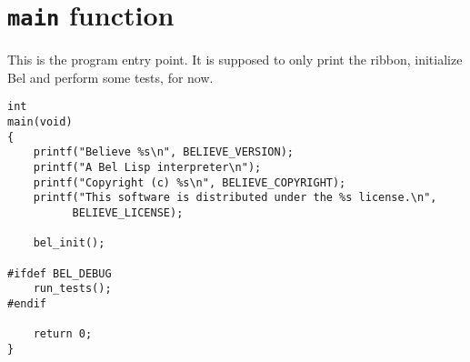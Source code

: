 \documentclass[openright,a4paper,twoside,12pt]{memoir}
\begin{document}
\section{\texttt{main} function}
\label{sec:orge465752}

This is the program entry point. It is supposed to only print the
ribbon, initialize Bel and perform some tests, for now.

\begin{verbatim}
int
main(void)
{
    printf("Believe %s\n", BELIEVE_VERSION);
    printf("A Bel Lisp interpreter\n");
    printf("Copyright (c) %s\n", BELIEVE_COPYRIGHT);
    printf("This software is distributed under the %s license.\n",
          BELIEVE_LICENSE);

    bel_init();

#ifdef BEL_DEBUG
    run_tests();
#endif
    
    return 0;
}
\end{verbatim}
\end{document}
